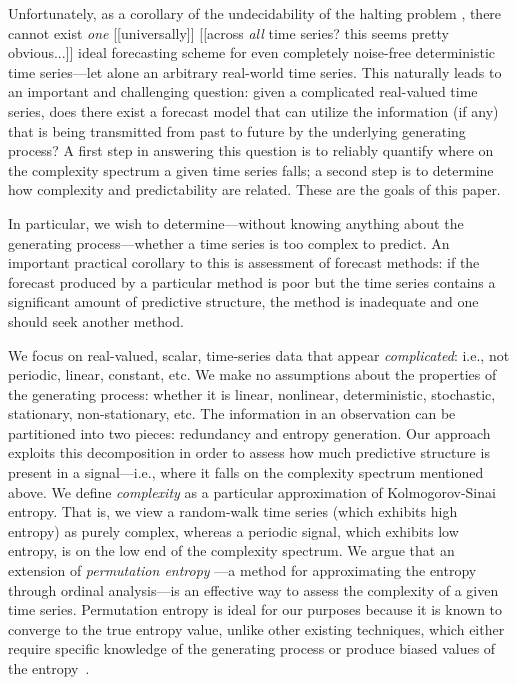 Unfortunately, as a corollary of the undecidability of the halting
problem \cite{halting-problem}, there cannot exist \emph{one}
[[universally]] [[across {\sl all} time series?  this seems pretty
    obvious...]] ideal forecasting scheme for even completely
noise-free deterministic time series\cite{weigend-book}---let alone an
arbitrary real-world time series.  This naturally leads to an
important and challenging question: given a complicated real-valued
time series, does there exist a forecast model that can utilize the
information (if any) that is being transmitted from past to future by
the underlying generating process?  A first step in answering this
question is to reliably quantify where on the complexity spectrum a
given time series falls; a second step is to determine how complexity
and predictability are related.  These are the goals of this paper.

In particular, we wish to determine---without knowing anything about
the generating process---whether a time series is too complex to
predict.  An important practical corollary to this is assessment of
forecast methods: if the forecast produced by a particular method is
poor but the time series contains a significant amount of predictive
structure, the method is inadequate and one should seek another
method.  

We focus on real-valued, scalar, time-series data that appear
\emph{complicated}: i.e., not periodic, linear, constant, etc.  We
make no assumptions about the properties of the generating process:
whether it is linear, nonlinear, deterministic, stochastic,
stationary, non-stationary, etc.  The information in an observation
can be partitioned into two pieces: redundancy and entropy
generation\cite{crutchfield2003}.  Our approach exploits this
decomposition in order to assess how much predictive structure is
present in a signal---i.e., where it falls on the complexity spectrum
mentioned above.  We define \emph{complexity} as a particular
approximation of Kolmogorov-Sinai entropy\cite{KS-entropy}.  That is,
we view a random-walk time series (which exhibits high entropy) as
purely complex, whereas a periodic signal, which exhibits low entropy,
is on the low end of the complexity spectrum.  We argue that an
extension of \emph{permutation entropy} \cite{bandt2002per}---a method
for approximating the entropy through ordinal analysis---is an
effective way to assess the complexity of a given time series.
Permutation entropy is ideal for our purposes because it is known to
converge to the true entropy value, unlike other existing techniques,
which either require specific knowledge of the generating process or
produce biased values of the entropy~\cite{bollt2001}.


